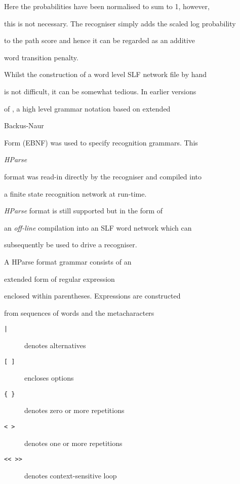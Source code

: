 Here the probabilities have been normalised to sum to 1, however,


this is not necessary.  The recogniser simply adds the scaled log probability


to the path score and hence it can be regarded as an additive


word transition penalty.










Whilst the construction of a word level SLF network file by hand


is not difficult, it can be somewhat tedious.  In earlier versions


of \HTK, a high level grammar notation based on extended 


Backus-Naur


Form (EBNF) was used to specify recognition grammars.  This 


\textit{HParse}


format was read-in directly by the recogniser and compiled into


a finite state recognition network at run-time.





\inthisversion \textit{HParse} format is still supported but in the form of


an \textit{off-line} compilation into an SLF word network which can


subsequently be used to drive a recogniser.  





A HParse format grammar consists of an 


extended form of regular expression


enclosed within parentheses.  Expressions are constructed


from sequences of words and the  metacharacters


\begin{description}


\item[\texttt{|}] denotes alternatives


\item[\texttt{[ ]}] encloses options


\item[\texttt{\{ \}}] denotes zero or more repetitions


\item[\texttt{< >}] denotes one or more repetitions


\item[\texttt{<< >>}] denotes context-sensitive loop


\end{description}


